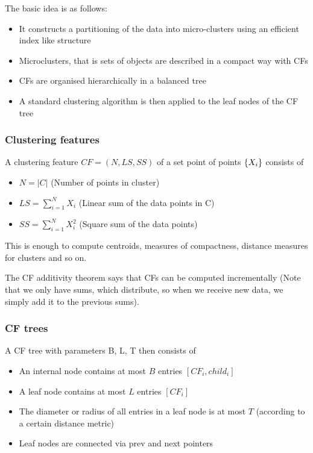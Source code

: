 The basic idea is as follows:
\begin{itemize}
    \item It constructs a partitioning of the data into micro-clusters using an efficient index like structure
    \item Microclusters, that is sets of objects are described in a compact way with CFs
    \item CFs are organised hierarchically in a balanced tree
    \item A standard clustering algorithm is then applied to the leaf nodes of the CF tree
\end{itemize}

\subsubsection{Clustering features}
A clustering feature $CF = (N, LS, SS)$ of a set point of points $\{X_i\}$ consists of
\begin{itemize}
    \item $N = |C|$ (Number of points in cluster)
    \item $LS = \sum_{i=1}^{N}{X_i}$ (Linear sum of the data points in C)
    \item $SS = \sum_{i=1}^{N}X_i^2$ (Square sum of the data points)
\end{itemize}
This is enough to compute centroids, measures of compactness, distance measures for clusters and so on. 

The CF additivity theorem says that CFs can be computed incrementally (Note that we only have sums, which distribute, so when we receive new data, we simply add it to the previous sums). 

\subsubsection{CF trees}
A CF tree with parameters B, L, T then consists of 
\begin{itemize}
    \item An internal node contains at most $B$ entries $[CF_i, child_i]$
    \item A leaf node contains at most $L$ entries $[CF_i]$
    \item The diameter or radius of all entries in a leaf node is at most $T$ (according to a certain distance metric)
    \item Leaf nodes are connected via prev and next pointers
\end{itemize}

